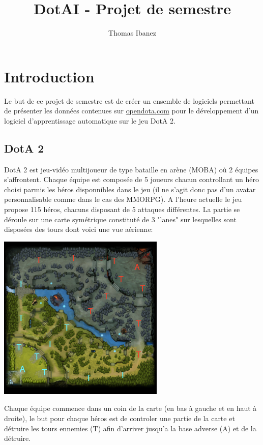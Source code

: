 \documentclass{article}
\title{DotAI - Projet de semestre}
\author{Thomas Ibanez}
\begin{document}
\maketitle

\newpage
\tableofcontents

\newpage

\section{Introduction}

Le but de ce projet de semestre est de créer un ensemble de logiciels permettant de présenter les données contenues sur \url{opendota.com} pour le développement d'un logiciel d'apprentissage automatique sur le jeu DotA 2.

\subsection{DotA 2}

DotA 2 est jeu-vidéo multijoueur de type bataille en arène (MOBA) où 2 équipes s'affrontent. Chaque équipe est composée de 5 joueurs chacun controllant un héro choisi parmis les héros disponnibles dans le jeu (il ne s'agit donc pas d'un avatar personnalisable comme dans le cas des MMORPG). A l'heure actuelle le jeu propose 115 héros, chacuns disposant de 5 attaques différentes. La partie se déroule sur une carte symétrique constituté de 3 "lanes" sur lesquelles sont disposées des tours dont voici une vue aérienne: \\
\begin{center}
	\includegraphics[scale=1]{"minimap.png"} 
\end{center}

Chaque équipe commence dans un coin de la carte (en bas à gauche et en haut à droite), le but pour chaque héros est de controler une partie de la carte et détruire les tours ennemies (T) afin d'arriver jusqu'a la base adverse (A) et de la détruire.\\
\end{document}

